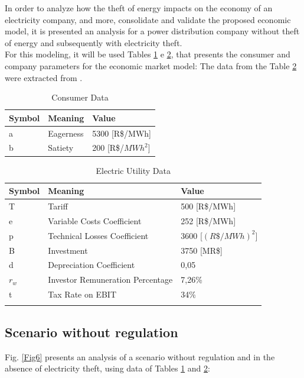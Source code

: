 \documentclass[preprint,12pt]{elsarticle}
\begin{document}
In order to analyze how the theft of energy impacts on the economy of an electricity company, and more, consolidate and validate the proposed economic model, it is presented an analysis for a power distribution company without theft of energy and subsequently with electricity theft. \\
For this modeling, it will be used Tables \ref{tA} e \ref{tB}, that presents the consumer and company parameters for the economic market model:
The data from the Table \ref{tB} were extracted from \citet{ANEEL2008Second33/208.}.

\begin{table} [h]%
\centering
\caption{Consumer Data}
\begin{tabular} {lll}
\hline 
\textbf{Symbol}&\textbf{Meaning}&\textbf{Value}\\
\hline
a&Eagerness&5300 [R\$/MWh]\\

b&Satiety&200 [R\$/$MWh^2$]\\
\hline 
\end{tabular}
\label{tA}
\end{table}

\begin{table}[h]%
\centering
\caption{Electric Utility Data}
\begin{tabular}{lll}
\hline
\textbf{Symbol}& \textbf{Meaning}& \textbf{Value}\\
\hline
T&Tariff&500 [R\$/MWh]\\
e&Variable Costs Coefficient&252 [R\$/MWh]\\
p&Technical Losses Coefficient&3600 [$(R\$/MWh)^2$]\\
B&Investment&3750 [MR\$]\\
d&Depreciation Coefficient&0,05\\
$r_w$&Investor Remuneration Percentage&7,26\%\\
t&Tax Rate on EBIT&34\%\\
\hline
\label{tB}
\end{tabular}
\end{table}

\subsection{Scenario without regulation}
\label{sec3-1}

Fig. \ref{Fig6} presents an analysis  of a scenario without regulation and in the absence of electricity theft, using data of Tables \ref{tA} and \ref{tB}:\\
\end{document}
